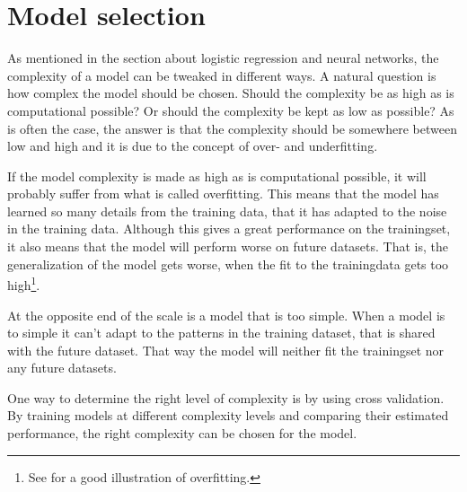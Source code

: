 \section{Model selection}
As mentioned in the section about logistic regression and neural networks, the complexity of a model can be tweaked in different ways. A natural question is how complex the model should be chosen. Should the complexity be as high as is computational possible? Or should the complexity be kept as low as possible? As is often the case, the answer is that the complexity should be somewhere between low and high and it is due to the concept of over- and underfitting. \par
If the model complexity is made as high as is computational possible, it will probably suffer from what is called overfitting. This means that the model has learned so many details from the training data, that it has adapted to the noise in the training data. Although this gives a great performance on the trainingset, it also means that the model will perform worse on future datasets. That is, the generalization of the model gets worse, when the fit to the trainingdata gets too high\footnote{See \citet[p.220]{hastie09} for a good illustration of overfitting.}. \par
At the opposite end of the scale is a model that is too simple. When a model is to simple it can't adapt to the patterns in the training dataset, that is shared with the future dataset. That way the model will neither fit the trainingset nor any future datasets. \par
One way to determine the right level of complexity is by using cross validation. By training models at different complexity levels and comparing their estimated performance, the right complexity can be chosen for the model.


